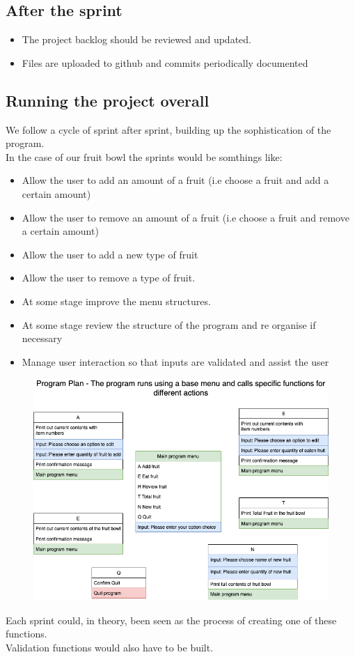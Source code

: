 \documentclass[a4paper,12pt]{article}
\begin{document}
\subsection{After the sprint}
\begin{itemize}
	\item The project backlog should be reviewed and updated.
	\item Files are uploaded to github and commits periodically documented
\end{itemize}
\newpage
\subsection{Running the project overall}
We follow a cycle of sprint after sprint, building up the sophistication of the program.\\
In the case of our fruit bowl the sprints would be somthings like:
\begin{itemize}
	\item Allow the user to add an amount of a fruit  (i.e choose a fruit and add a certain amount)
	\item Allow the user to remove an amount of a fruit  (i.e choose a fruit and remove a certain amount)
	\item Allow the user to add a new type of fruit
	\item Allow the user to remove a type of fruit.
	\item At some stage improve the menu structures.
	\item At some stage review the structure of the program and re organise if necessary
	\item Manage user interaction so that inputs are validated and assist the user 
\end{itemize}

\begin{figure}[!ht]
	\centering
	\includegraphics[width=14cm]{images/GeneralPlanning-Fruit_Structure.png}
\end{figure}
Each sprint could, in theory, been seen as the process of creating one of these functions.\\
Validation functions would also have to be built.
\newpage
\end{document}
